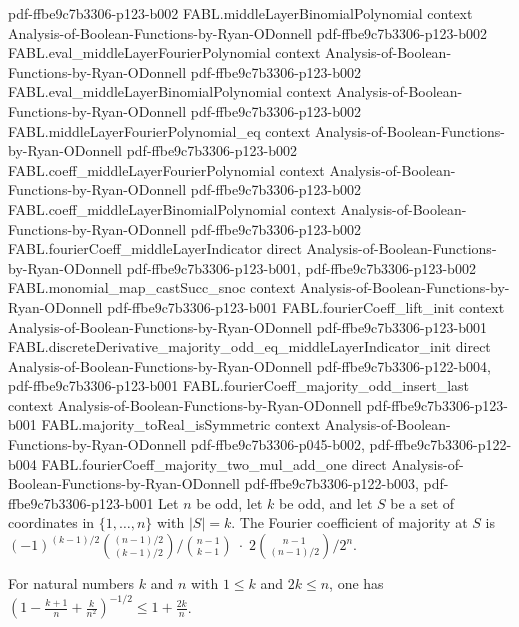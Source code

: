 \begin{theorem}
  {pdf-ffbe9c7b3306-p123-b002}
\proofstep
  {FABL.middleLayerBinomialPolynomial}
  {context}
  {Analysis-of-Boolean-Functions-by-Ryan-ODonnell}
  {pdf-ffbe9c7b3306-p123-b002}
\proofstep
  {FABL.eval_middleLayerFourierPolynomial}
  {context}
  {Analysis-of-Boolean-Functions-by-Ryan-ODonnell}
  {pdf-ffbe9c7b3306-p123-b002}
\proofstep
  {FABL.eval_middleLayerBinomialPolynomial}
  {context}
  {Analysis-of-Boolean-Functions-by-Ryan-ODonnell}
  {pdf-ffbe9c7b3306-p123-b002}
\proofstep
  {FABL.middleLayerFourierPolynomial_eq}
  {context}
  {Analysis-of-Boolean-Functions-by-Ryan-ODonnell}
  {pdf-ffbe9c7b3306-p123-b002}
\proofstep
  {FABL.coeff_middleLayerFourierPolynomial}
  {context}
  {Analysis-of-Boolean-Functions-by-Ryan-ODonnell}
  {pdf-ffbe9c7b3306-p123-b002}
\proofstep
  {FABL.coeff_middleLayerBinomialPolynomial}
  {context}
  {Analysis-of-Boolean-Functions-by-Ryan-ODonnell}
  {pdf-ffbe9c7b3306-p123-b002}
\proofstep
  {FABL.fourierCoeff_middleLayerIndicator}
  {direct}
  {Analysis-of-Boolean-Functions-by-Ryan-ODonnell}
  {pdf-ffbe9c7b3306-p123-b001,
    pdf-ffbe9c7b3306-p123-b002}
\proofstep
  {FABL.monomial_map_castSucc_snoc}
  {context}
  {Analysis-of-Boolean-Functions-by-Ryan-ODonnell}
  {pdf-ffbe9c7b3306-p123-b001}
\proofstep
  {FABL.fourierCoeff_lift_init}
  {context}
  {Analysis-of-Boolean-Functions-by-Ryan-ODonnell}
  {pdf-ffbe9c7b3306-p123-b001}
\proofstep
  {FABL.discreteDerivative_majority_odd_eq_middleLayerIndicator_init}
  {direct}
  {Analysis-of-Boolean-Functions-by-Ryan-ODonnell}
  {pdf-ffbe9c7b3306-p122-b004,
    pdf-ffbe9c7b3306-p123-b001}
\proofstep
  {FABL.fourierCoeff_majority_odd_insert_last}
  {context}
  {Analysis-of-Boolean-Functions-by-Ryan-ODonnell}
  {pdf-ffbe9c7b3306-p123-b001}
\proofstep
  {FABL.majority_toReal_isSymmetric}
  {context}
  {Analysis-of-Boolean-Functions-by-Ryan-ODonnell}
  {pdf-ffbe9c7b3306-p045-b002,
    pdf-ffbe9c7b3306-p122-b004}
\proofstep
  {FABL.fourierCoeff_majority_two_mul_add_one}
  {direct}
  {Analysis-of-Boolean-Functions-by-Ryan-ODonnell}
  {pdf-ffbe9c7b3306-p122-b003,
    pdf-ffbe9c7b3306-p123-b001}
Let $n$ be odd, let $k$ be odd, and let $S$ be a set of coordinates in
$\{1,\ldots,n\}$ with $|S|=k$. The Fourier coefficient of majority at $S$ is
$(-1)^{(k-1)/2}\binom{(n-1)/2}{(k-1)/2}\big/\binom{n-1}{k-1}\;\cdot\;2\binom{n-1}{(n-1)/2}/2^n$.
\end{theorem}

\begin{theorem}
\label{FABL.exercise5_24}
\leanok
{}
For natural numbers $k$ and $n$ with $1\leq k$ and $2k\leq n$, one has
$\left(1-\frac{k+1}{n}+\frac{k}{n^2}\right)^{-1/2}\leq 1+\frac{2k}{n}$.
\end{theorem}
